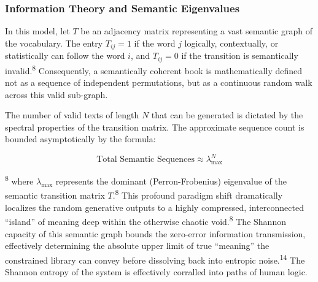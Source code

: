 \documentclass[
  11pt,
  a4paper,
]{article}
\begin{document}
\subsubsection{Information Theory and Semantic Eigenvalues}\label{information-theory-and-semantic-eigenvalues}

In this model, let \(T\) be an adjacency matrix representing a vast semantic graph of the vocabulary. The entry \(T_{ij}=1\) if the word \(j\) logically, contextually, or statistically can follow the word \(i\), and \(T_{ij}=0\) if the transition is semantically invalid.\textsuperscript{8} Consequently, a semantically coherent book is mathematically defined not as a sequence of independent permutations, but as a continuous random walk across this valid sub-graph.

The number of valid texts of length \(N\) that can be generated is dictated by the spectral properties of the transition matrix. The approximate sequence count is bounded asymptotically by the formula:

\[
\text{Total Semantic Sequences} \approx \lambda_{\max}^N
\]

\textsuperscript{8} where \(\lambda_{\max}\) represents the dominant (Perron-Frobenius) eigenvalue of the semantic transition matrix \(T\).\textsuperscript{8} This profound paradigm shift dramatically localizes the random generative outputs to a highly compressed, interconnected ``island'' of meaning deep within the otherwise chaotic void.\textsuperscript{8} The Shannon capacity of this semantic graph bounds the zero-error information transmission, effectively determining the absolute upper limit of true ``meaning'' the constrained library can convey before dissolving back into entropic noise.\textsuperscript{14} The Shannon entropy of the system is effectively corralled into paths of human logic.
\end{document}
